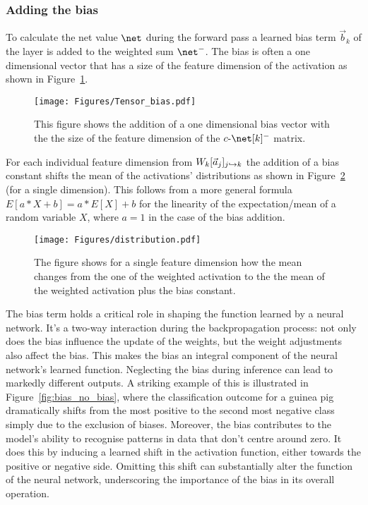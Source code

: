 \subsubsection{Adding the bias}
\label{section:adding_the_bias}
To calculate the net value $\net$ during the forward pass a learned bias term $\vec{b}_k$ of the layer is added to the weighted sum $\net^-$. The bias is often a one dimensional vector that has a size of the feature dimension of the activation as shown in Figure~\ref{fig:dimentionality_bias}. 
\begin{figure}[ht!]
	\begin{center}
		\texttt{[image: Figures/Tensor\_bias.pdf]}
	\end{center}
	\caption{This figure shows the addition of a one dimensional bias vector with the the size of the feature dimension of the $\cnet^-$ matrix.}
	\label{fig:dimentionality_bias}
\end{figure} 
\newline
For each individual feature dimension from $W_k [\vec{a}_j]_{j\hookrightarrow k}$ the addition of a bias constant shifts the mean of the activations' distributions as shown in Figure~\ref{fig:addingbias} (for a single dimension). This follows from a more general formula $E[a*X+b] = a*E[X] + b$ for the linearity of the expectation/mean of a random variable $X$, where $a =1$ in the case of the bias addition. 
\begin{figure}[ht!]
	\begin{center}
		\texttt{[image: Figures/distribution.pdf]}
	\end{center}
	\caption{The figure shows for a single feature dimension how the mean changes from the one of the weighted activation to the the mean of the weighted activation plus the bias constant.}
	\label{fig:addingbias}
\end{figure} 
\newline
\noindent
The bias term holds a critical role in shaping the function learned by a neural network. It's a two-way interaction during the backpropagation process: not only does the bias influence the update of the weights, but the weight adjustments also affect the bias. This makes the bias an integral component of the neural network's learned function. Neglecting the bias during inference can lead to markedly different outputs. A striking example of this is illustrated in Figure~\ref{fig:bias_no_bias}, where the classification outcome for a guinea pig dramatically shifts from the most positive to the second most negative class simply due to the exclusion of biases. Moreover, the bias contributes to the model's ability to recognise patterns in data that don't centre around zero. It does this by inducing a learned shift in the activation function, either towards the positive or negative side. Omitting this shift can substantially alter the function of the neural network, underscoring the importance of the bias in its overall operation.

